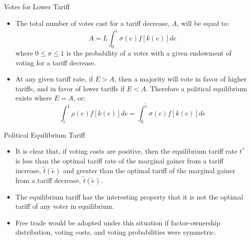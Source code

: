\documentclass[aspectratio=169]{beamer}
\begin{document}

\begin{frame}{Votes for Lower Tariff}

\begin{itemize}
    \item<1-> The total number of votes cast for a tariff decrease, $ A $, will be equal to:
    \begin{equation*}
        A = L \int_{0}^{\tilde{e}} \sigma\left( e \right) f\left[ k\left( e \right) \right] de
    \end{equation*}
    where $ 0 \le \sigma \le 1 $ is the probability of a voter with a given endowment of voting for a tariff decrease.
    \item<2-> At any given tariff rate, if $ E > A $, then a majority will vote in favor of higher tariffs, and in favor of lower tariffs if $ E < A $.  Therefore a political equilibrium exists where $ E = A $, or:
    \begin{equation*}
        \int_{\tilde{e}}^{1} \rho\left( e \right) f\left[ k\left( e \right) \right] de = \int_{0}^{\tilde{e}} \sigma\left( e \right) f\left[ k\left( e \right) \right] de
    \end{equation*}
\end{itemize}
    
\end{frame}


\begin{frame}{Political Equilibrium Tariff}

\begin{itemize}
    \item<1->  It is clear that, if voting costs are positive, then the equilibrium tariff rate $ t^{*} $ is less than the optimal tariff rate of the marginal gainer from a tariff increase, $ \tilde{t} \left(  \tilde{e} \right) $ and greater than the optimal tariff of the marginal gainer from a tariff decrease, $ \tilde{t}\left( \tilde{e} \right) $.
    \item<2-> The equilibrium tariff has the interesting property that it is not the optimal tariff of any voter in equilibrium.
    \item<3-> Free trade would be adopted under this situation if factor-ownership distribution, voting costs, and voting probabilities were symmetric.
\end{itemize}

\end{frame}
\end{document}
